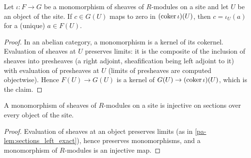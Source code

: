 \begin{lemma}
  \label{pa-lem:sections_left_exact}
  \leanok

  Let \(\iota : F \to G\) be a monomorphism of sheaves of \(R\)-modules on a site and let
  \(U\) be an object of the site. If \(c \in G(U)\) maps to zero in \((\operatorname{coker} \iota)(U)\),
  then \(c = \iota_U(a)\) for a (unique) \(a \in F(U)\).
\end{lemma}
\begin{proof}
  \leanok
  In an abelian category, a monomorphism is a kernel of its cokernel. Evaluation of sheaves
  at \(U\) preserves limits: it is the composite of the inclusion of sheaves into presheaves
  (a right adjoint, sheafification being left adjoint to it) with evaluation of presheaves at
  \(U\) (limits of presheaves are computed objectwise). Hence
  \(F(U) \to G(U)\) is a kernel of \(G(U) \to (\operatorname{coker} \iota)(U)\), which is the claim.
\end{proof}

\begin{lemma}
  \label{pa-lem:app_injective_of_mono}
  \leanok

  A monomorphism of sheaves of \(R\)-modules on a site is injective on sections over every
  object of the site.
\end{lemma}
\begin{proof}
  \leanok
  Evaluation of sheaves at an object preserves limits (as in
  \ref{pa-lem:sections_left_exact}), hence preserves monomorphisms, and a monomorphism of
  \(R\)-modules is an injective map.
\end{proof}


